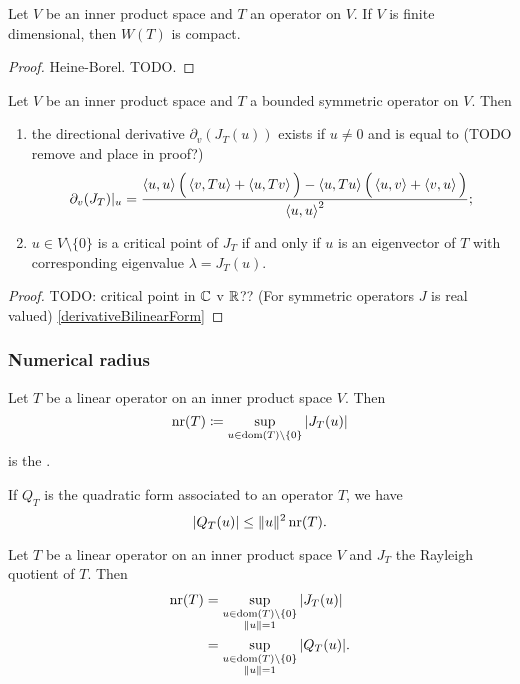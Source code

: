 \begin{proposition}
Let $V$ be an inner product space and $T$ an operator on $V$. If $V$ is finite dimensional, then $W(T)$ is compact.
\end{proposition}
\begin{proof}
Heine-Borel. TODO.
\end{proof}

\begin{lemma}
Let $V$ be an inner product space and $T$ a bounded symmetric operator on $V$. Then
\begin{enumerate}
\item the directional derivative $\partial_v(J_T(u))$ exists if $u\neq 0$ and is equal to (TODO remove and place in proof?)
\[ \partial_v(J_T)|_u = \frac{\left\langle u,u \right\rangle\Big( \left\langle v,Tu \right\rangle + \left\langle u,Tv \right\rangle \Big) - \left\langle u,Tu \right\rangle\Big(\left\langle u,v \right\rangle+\left\langle v,u \right\rangle\Big)}{\left\langle u,u \right\rangle^2}; \]
\item $u\in V\setminus \{ 0 \}$ is a critical point of $J_T$ \textup{if and only if} $u$ is an eigenvector of $T$ with corresponding eigenvalue $\lambda = J_T(u)$.
\end{enumerate}
\end{lemma}
\begin{proof}
TODO: critical point in $\mathbb{C}$ v $\mathbb{R}$?? (For symmetric operators $J$ is real valued)
\ref{derivativeBilinearForm}
\end{proof}

\subsubsection{Numerical radius}
\begin{definition}
Let $T$ be a linear operator on an inner product space $V$. Then
\[ \operatorname{nr}(T) \coloneqq \sup_{u\in \operatorname{dom}(T)\setminus\{0\}} |J_T(u)| \]
is the .
\end{definition}
If $Q_T$ is the quadratic form associated to an operator $T$, we have
\[ |Q_T(u)| \leq \lVert u\rVert^2\operatorname{nr}(T). \]

\begin{lemma}
Let $T$ be a linear operator on an inner product space $V$ and $J_T$ the Rayleigh quotient of $T$. Then
\begin{align*}
\operatorname{nr}(T) &= \sup_{\substack{u\in \operatorname{dom}(T) \setminus\{0\}\\ \lVert u\rVert = 1}} |J_T(u)| \\
&= \sup_{\substack{u\in \operatorname{dom}(T) \setminus\{0\}\\ \lVert u\rVert = 1}} |Q_T(u)|.
\end{align*}
\end{lemma}


